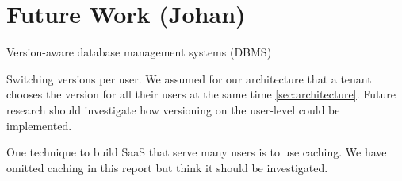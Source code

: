 \section{Future Work (Johan)}
\label{sec:futurework}

Version-aware database management systems (DBMS)

Switching versions per user. We assumed for our architecture that a tenant chooses the version for all their users at the same time \ref{sec:architecture}. Future research should investigate how versioning on the user-level could be implemented.

One technique to build SaaS that serve many users is to use caching. We have omitted caching in this report but think it should be investigated.